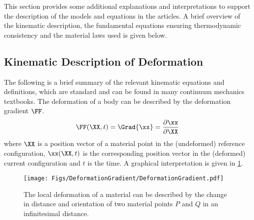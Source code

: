 This section provides some additional explanations and interpretations to support the description of the models and equations in the articles. A brief overview of the kinematic description, the fundamental equations ensuring thermodynamic consistency and the material laws used is given below.
\subsection{Kinematic Description of Deformation}\label{sec:kinematics}
The following is a brief summary of the relevant kinematic equations and definitions, which are standard and can be found in many continuum mechanics textbooks\supercite{haupt_continuum_2002,bonet_nonlinear_2008,altenbach_kontinuumsmechanik_2015}. The deformation of a body can be described by the deformation gradient $\FF$.  
\begin{align}
  \FF(\XX,t) = \Grad{\xx} = \frac{\partial \xx}{\partial \XX} 
\end{align}
where $\XX$ is a position vector of a material point in the (undeformed) reference configuration, $\xx(\XX,t)$ is the corresponding position vector in the (deformed) current configuration and $t$ is the time. A graphical interpretation is given in \cref{fig:DeformationGradient}. \\
\begin{figure}[h!]
  \centering
  \texttt{[image: Figs/DeformationGradient/DeformationGradient.pdf]}
  \caption[]{The local deformation of a material can be described by the change in distance and orientation of two material points $P$ and $Q$ in an infinitesimal distance. }
  \label{fig:DeformationGradient}
\end{figure}

